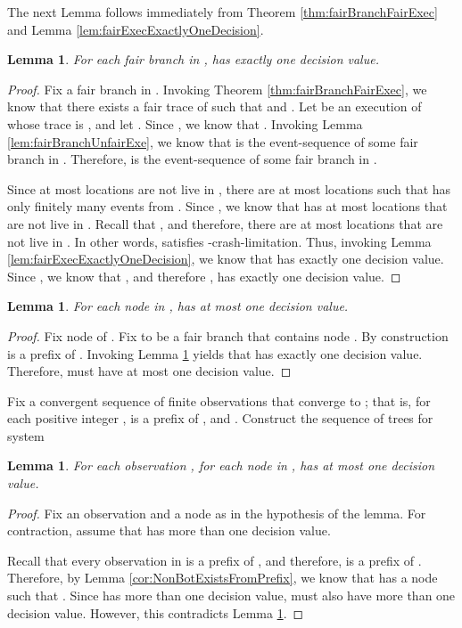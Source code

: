 \documentclass[11pt]{article}
\numberwithin{theorem}{section}
\newtheorem{lemma}[theorem]{Lemma}
\begin{document}
The next Lemma follows immediately from Theorem \ref{thm:fairBranchFairExec} and Lemma \ref{lem:fairExecExactlyOneDecision}.
\begin{lemma}\label{prop:fairBranchOneDecision}
 For each fair branch  in ,  has exactly one decision value.
\end{lemma}
\begin{proof}
Fix a fair branch  in . Invoking Theorem \ref{thm:fairBranchFairExec}, we know that there exists a fair trace  of  such that  and . Let  be an execution of  whose trace is , and let . Since , we know that . Invoking Lemma \ref{lem:fairBranchUnfairExe}, we know that  is the event-sequence of some fair branch in . Therefore,  is the event-sequence of some fair branch in .
 
Since at most  locations are not live in , there are at most  locations  such that  has only finitely many events from . Since , we know that  has at most  locations that are not live in . Recall that , and therefore, there are at most  locations that are not live in . In other words,  
satisfies -crash-limitation. Thus, invoking Lemma \ref{lem:fairExecExactlyOneDecision}, we know that  has exactly one decision value. Since , we know that , and therefore , has exactly one decision value.
\end{proof}
\begin{lemma}\label{prop:eachNodeAtMostOneDecision}
 For each node  in ,  has at most one decision value.
\end{lemma}
\begin{proof}
Fix node  of . Fix  to be a fair branch that contains node . By construction  is a prefix of . Invoking Lemma \ref{prop:fairBranchOneDecision} yields that  has exactly one decision value. Therefore,  must have at most one decision value.
\end{proof}

Fix a convergent sequence of finite observations  that converge to ; that is, for each positive integer ,  is a prefix of , and . Construct the sequence of trees  for system 


\begin{lemma}\label{prop:eachNodeAtMostOneDecisionInAllGs}
 For each observation , for each node  in ,  has at most one decision value.
\end{lemma}
\begin{proof}
Fix an observation  and a node  as in the hypothesis of the lemma. For contraction, assume that  has more than one decision value.

Recall that every observation in  is a prefix of , and therefore,  is a prefix of . Therefore, by Lemma \ref{cor:NonBotExistsFromPrefix}, we know that  has a node  such that . Since  has more than one decision value,  must also have more than one decision value. However, this contradicts Lemma \ref{prop:eachNodeAtMostOneDecision}.
\end{proof}
\end{document}
